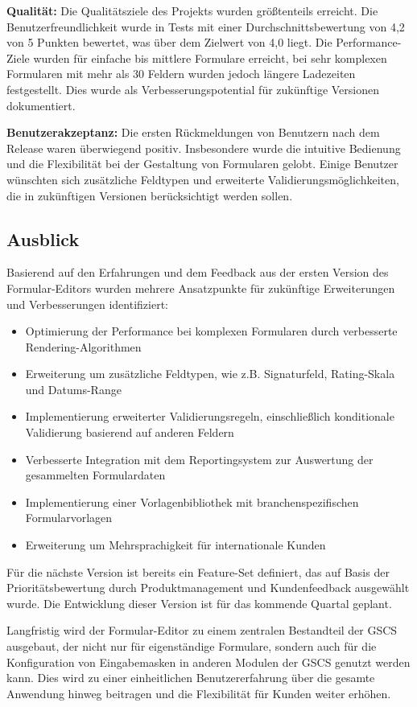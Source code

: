 \documentclass[a4paper,11pt]{article}
\begin{document}
\textbf{Qualität:} Die Qualitätsziele des Projekts wurden größtenteils erreicht. Die Benutzerfreundlichkeit wurde in Tests mit einer Durchschnittsbewertung von 4,2 von 5 Punkten bewertet, was über dem Zielwert von 4,0 liegt. Die Performance-Ziele wurden für einfache bis mittlere Formulare erreicht, bei sehr komplexen Formularen mit mehr als 30 Feldern wurden jedoch längere Ladezeiten festgestellt. Dies wurde als Verbesserungspotential für zukünftige Versionen dokumentiert.

\textbf{Benutzerakzeptanz:} Die ersten Rückmeldungen von Benutzern nach dem Release waren überwiegend positiv. Insbesondere wurde die intuitive Bedienung und die Flexibilität bei der Gestaltung von Formularen gelobt. Einige Benutzer wünschten sich zusätzliche Feldtypen und erweiterte Validierungsmöglichkeiten, die in zukünftigen Versionen berücksichtigt werden sollen.

\subsection{Ausblick}
Basierend auf den Erfahrungen und dem Feedback aus der ersten Version des Formular-Editors wurden mehrere Ansatzpunkte für zukünftige Erweiterungen und Verbesserungen identifiziert:

\begin{itemize}
  \item Optimierung der Performance bei komplexen Formularen durch verbesserte Rendering-Algorithmen
  \item Erweiterung um zusätzliche Feldtypen, wie z.B. Signaturfeld, Rating-Skala und Datums-Range
  \item Implementierung erweiterter Validierungsregeln, einschließlich konditionale Validierung basierend auf anderen Feldern
  \item Verbesserte Integration mit dem Reportingsystem zur Auswertung der gesammelten Formulardaten
  \item Implementierung einer Vorlagenbibliothek mit branchenspezifischen Formularvorlagen
  \item Erweiterung um Mehrsprachigkeit für internationale Kunden
\end{itemize}

Für die nächste Version ist bereits ein Feature-Set definiert, das auf Basis der Prioritätsbewertung durch Produktmanagement und Kundenfeedback ausgewählt wurde. Die Entwicklung dieser Version ist für das kommende Quartal geplant.

Langfristig wird der Formular-Editor zu einem zentralen Bestandteil der GSCS ausgebaut, der nicht nur für eigenständige Formulare, sondern auch für die Konfiguration von Eingabemasken in anderen Modulen der GSCS genutzt werden kann. Dies wird zu einer einheitlichen Benutzererfahrung über die gesamte Anwendung hinweg beitragen und die Flexibilität für Kunden weiter erhöhen.
\end{document}
